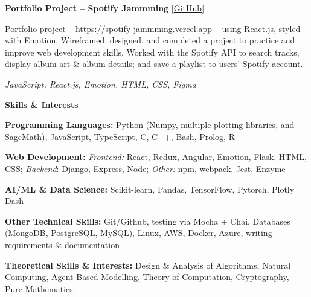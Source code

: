 \documentclass[12pt, a4paper]{article}
\begin{document}
    
\textbf{Portfolio Project -- Spotify Jammming} \hfill [\href{https://github.com/m-usaid99/spotify-jammming}{GitHub}]
    \begin{center}
        \parbox{0.9\linewidth}{
            Portfolio project -- \url{https://spotify-jammming.vercel.app} -- using React.js, styled with Emotion. Wireframed, designed, and completed a project to practice and improve web development skills. Worked with the Spotify API to search tracks, display album art \& album details; and save a playlist to users' Spotify account. 

            \textit{JavaScript, React.js, Emotion, HTML, CSS, Figma}
        }
    \end{center}

\begin{center}
    \large\textbf{Skills \& Interests}
\end{center}

\textbf{Programming Languages:} Python (Numpy, multiple plotting libraries, and SageMath), JavaScript, TypeScript, C, C++, Bash, Prolog, R

\textbf{Web Development:} \textit{Frontend:} React, Redux, Angular, Emotion, Flask, HTML, CSS; \textit{Backend}: Django, Express, Node; \textit{Other:} npm, webpack, Jest, Enzyme

\textbf{AI/ML \& Data Science:} Scikit-learn, Pandas, TensorFlow, Pytorch, Plotly Dash 

\textbf{Other Technical Skills:} Git/Github, testing via Mocha + Chai, Databases (MongoDB, PostgreSQL, MySQL), Linux, AWS, Docker, Azure, writing requirements \& documentation

\textbf{Theoretical Skills \& Interests:} Design \& Analysis of Algorithms, Natural Computing, Agent-Based Modelling, Theory of Computation, Cryptography, Pure Mathematics
\end{document}
